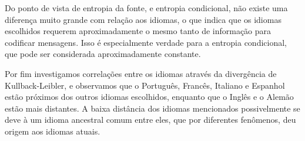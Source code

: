 \documentclass[aps, 10pt, twocolumn, prb, longbibliography, superscriptaddress]{revtex4-2}
\begin{document}
Do ponto de vista de entropia da fonte, e entropia condicional,
não existe uma diferença muito grande com relação aos idiomas, o que
indica que os idiomas escolhidos requerem aproximadamente o
mesmo tanto de informação para codificar mensagens. Isso é
especialmente verdade para a entropia condicional, que pode ser
considerada aproximadamente constante.

Por fim investigamos correlações entre os idiomas através
da divergência de Kullback-Leibler, e observamos que
o Português, Francês, Italiano e Espanhol estão próximos
dos outros idiomas escolhidos, enquanto que o Inglês
e o Alemão estão mais distantes. A baixa distância
dos idiomas mencionados possivelmente se deve à um idioma
ancestral comum entre eles, que por diferentes fenômenos,
deu origem aos idiomas atuais.


\end{document}
